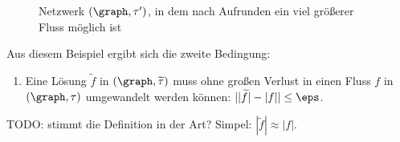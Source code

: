 \begin{example}
    \begin{figure}[H]
    \subfloat{\usebox{\tempbox}}%
    \qquad
      \caption{Netzwerk $(\graph, \tau')$, in dem nach Aufrunden ein viel größerer
        Fluss möglich ist}\label{fig:ex_val_red_2}
    \end{figure}    
\end{example}

Aus diesem Beispiel ergibt sich die zweite Bedingung:
\begin{enumerate}[resume, label={\textbf{(A\arabic*)}}]
    \item Eine Lösung $\widetilde{f}$ in $(\graph, \widetilde{\tau})$ muss
        ohne großen Verlust in einen Fluss $f$ in $(\graph, \tau)$
        umgewandelt werden können: $||\widetilde{f}| - |f|| \leq \eps$.
        \label{a2}
\end{enumerate}
TODO: stimmt die Definition in der Art? Simpel: $|\widetilde{f}| \approx |f|$.

